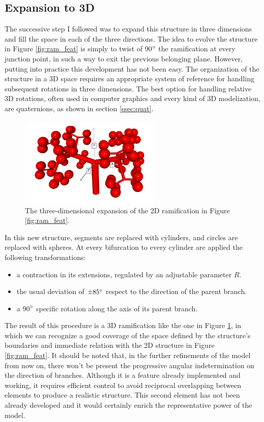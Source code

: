 \documentclass[12pt,a4paper]{report}
\begin{document}
\subsection{Expansion to 3D}
    The successive step I followed was to expand this structure in three dimensions and fill the space in each of the three directions. The idea to evolve the structure in Figure \ref{fig:ram_feat} is simply to twist of 90$\degree$ the ramification at every junction point, in such a way to exit the previous belonging plane. However, putting into practice this development has not been easy. The organization of the structure in a 3D space requires an appropriate system of reference for handling subsequent rotations in three dimensions. The best option for handling relative 3D rotations, often used in computer graphics and every kind of 3D modelization, are quaternions, as shown in section \ref{ssec:quat}.

    \begin{figure}
        \centering
        \includegraphics[width = 0.6\textwidth]{images/3d_ram}
        \caption{The three-dimensional expansion of the 2D ramification in Figure \ref{fig:ram_feat}.}
        \label{fig:3d_ram}
    \end{figure}

    In this new structure, segments are replaced with cylinders, and circles are replaced with spheres. At every bifurcation to every cylinder are applied the following transformations:
    \begin{itemize}
        \item a contraction in its extensions, regulated by an adjustable parameter $R$.
        \item the usual deviation of $\pm 85 \degree$ respect to the direction of the parent branch.
        \item a 90$\degree$ specific rotation along the axis of its parent branch.
    \end{itemize}

    The result of this procedure is a 3D ramification like the one in Figure \ref{fig:3d_ram}, in which we can recognize a good coverage of the space defined by the structure's boundaries and immediate relation with the 2D structure in Figure \ref{fig:ram_feat}. It should be noted that, in the further refinements of the model from now on, there won't be present the progressive angular indetermination on the direction of branches. Although it is a feature already implemented and working, it requires efficient control to avoid reciprocal overlapping between elements to produce a realistic structure. This second element has not been already developed and it would certainly enrich the representative power of the model.
\end{document}
